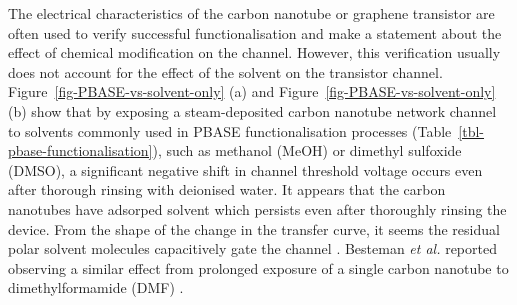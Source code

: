 \documentclass[
  a4paper,
]{scrbook}
\begin{document}
The electrical characteristics of the carbon nanotube or graphene
transistor are often used to verify successful functionalisation and
make a statement about the effect of chemical modification on the
channel. However, this verification usually does not account for the
effect of the solvent on the transistor channel.
Figure~\ref{fig-PBASE-vs-solvent-only} (a) and
Figure~\ref{fig-PBASE-vs-solvent-only} (b) show that by exposing a
steam-deposited carbon nanotube network channel to solvents commonly
used in PBASE functionalisation processes
(Table~\ref{tbl-pbase-functionalisation}), such as methanol (MeOH) or
dimethyl sulfoxide (DMSO), a significant negative shift in channel
threshold voltage occurs even after thorough rinsing with deionised
water. It appears that the carbon nanotubes have adsorped solvent which
persists even after thoroughly rinsing the device. From the shape of the
change in the transfer curve, it seems the residual polar solvent
molecules capacitively gate the channel
\autocite{Artyukhin2006,Heller2008}. Besteman \emph{et al.} reported
observing a similar effect from prolonged exposure of a single carbon
nanotube to dimethylformamide (DMF) \autocite{Besteman2003}.
\end{document}

